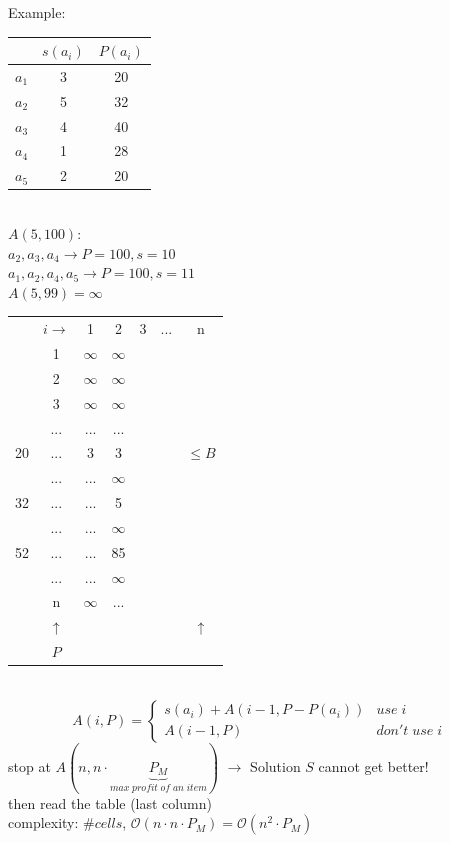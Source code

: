 Example: \\
\begin{tabular}{c|c|c}
& $s(a_i)$ & $P(a_i)$ \\ \hline 
$a_1$ & 3 & 20 \\
$a_2$ & 5 & 32 \\
$a_3$ & 4 & 40 \\
$a_4$ & 1 & 28 \\
$a_5$ & 2 & 20 \\
\end{tabular} \\
$A(5,100)$: \\
$a_2,a_3,a_4 \rightarrow P = 100, s = 10$ \\
$a_1,a_2,a_4,a_5 \rightarrow P = 100, s = 11$ \\
$A(5,99) = \infty$ \\
\begin{tabular}{cccccc|c|}
	& $i \rightarrow $ & 1 & 2 & 3 & ... & n \\
	& 1 & $\infty$ & $\infty$ & & & \\
	& 2 & $\infty$ & $\infty$ & & & \\
	& 3 & $\infty$ & $\infty$ & & & \\
	& ... & ... & ... & & & \\
	20 & ... & 3 & 3 & & & $\leq B$ \\
	& ... & ... & $\infty$ & & &  \\
	32 & ... & ... & 5 & & &  \\
	& ... & ... & $\infty$ & & &  \\
	52 & ... & ... &85 & & &  \\
	& ... & ... & $\infty$ & & &  \\
	& n & $\infty$ & ... & && \\
	& $\uparrow$ &&&&& $\uparrow$ \\
	& $P$ &&&&& \\
\end{tabular} \\
$$A(i,P) = \begin{cases}
s(a_i) + A(i-1,P-P(a_i)) & use \; i \\A(i-1,P) & don't \; use \; i
\end{cases}$$
stop at $A(n,n \cdot \underbrace{P_M}_{max \; profit \; of \; an \; item})$ $\rightarrow$ Solution $S$ cannot get better! \\
then read the table (last column) \\
complexity: $\#cells$, $\mathcal{O}(n\cdot n \cdot P_M) = \mathcal{O}(n^2 \cdot P_M)$ \\
